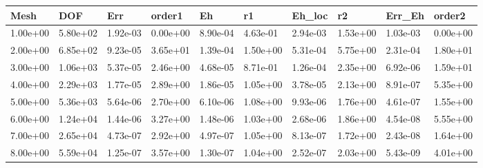 \begin{tabular}{llllllllll}
Mesh & DOF & Err & order1 & Eh & r1 & Eh_loc & r2 & Err_Eh & order2 \\ 
\hline 
1.00e+00 & 5.80e+02 & 1.92e-03 & 0.00e+00 & 8.90e-04 & 4.63e-01 & 2.94e-03 & 1.53e+00 & 1.03e-03 & 0.00e+00 \\ 
2.00e+00 & 6.85e+02 & 9.23e-05 & 3.65e+01 & 1.39e-04 & 1.50e+00 & 5.31e-04 & 5.75e+00 & 2.31e-04 & 1.80e+01 \\ 
3.00e+00 & 1.06e+03 & 5.37e-05 & 2.46e+00 & 4.68e-05 & 8.71e-01 & 1.26e-04 & 2.35e+00 & 6.92e-06 & 1.59e+01 \\ 
4.00e+00 & 2.29e+03 & 1.77e-05 & 2.89e+00 & 1.86e-05 & 1.05e+00 & 3.78e-05 & 2.13e+00 & 8.91e-07 & 5.35e+00 \\ 
5.00e+00 & 5.36e+03 & 5.64e-06 & 2.70e+00 & 6.10e-06 & 1.08e+00 & 9.93e-06 & 1.76e+00 & 4.61e-07 & 1.55e+00 \\ 
6.00e+00 & 1.24e+04 & 1.44e-06 & 3.27e+00 & 1.48e-06 & 1.03e+00 & 2.68e-06 & 1.86e+00 & 4.54e-08 & 5.55e+00 \\ 
7.00e+00 & 2.65e+04 & 4.73e-07 & 2.92e+00 & 4.97e-07 & 1.05e+00 & 8.13e-07 & 1.72e+00 & 2.43e-08 & 1.64e+00 \\ 
8.00e+00 & 5.59e+04 & 1.25e-07 & 3.57e+00 & 1.30e-07 & 1.04e+00 & 2.52e-07 & 2.03e+00 & 5.43e-09 & 4.01e+00 \\ 
\hline 
\end{tabular}